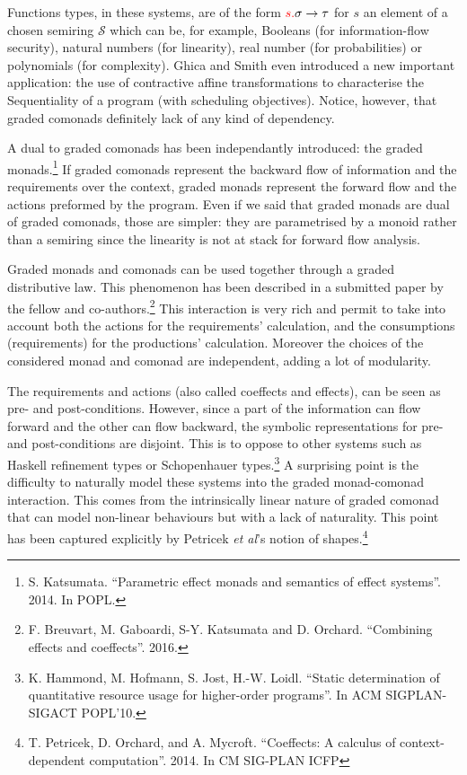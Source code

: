 \documentclass{article}[11pt]
\newcommand\sS{\mathcal S}
\begin{document}
Functions types, in these systems, are of the form ${\color{red}s.}\sigma\rightarrow \tau$ for $s$ an element of a chosen semiring $\sS$ which can be, for example, Booleans (for information-flow security), natural numbers (for linearity), real number (for probabilities) or polynomials (for complexity). Ghica and Smith even introduced a new important application: the use of contractive affine transformations to characterise the Sequentiality of a program (with scheduling objectives). Notice, however, that graded comonads definitely lack of any kind of dependency.

A dual to graded comonads has been independantly introduced: the graded monads.\footnote{S. Katsumata. ``Parametric effect monads and semantics of effect systems''. 2014. In POPL.} If graded comonads represent the backward flow of information and the requirements over the context, graded monads represent the forward flow and the actions preformed by the program. Even if we said that graded monads are dual of graded comonads, those are simpler: they are parametrised by a monoid rather than a semiring since the linearity is not at stack for forward flow analysis.

Graded monads and comonads can be used together through a graded distributive law. This phenomenon has been described in a submitted paper by the fellow and co-authors.\footnote{F. Breuvart, M. Gaboardi, S-Y. Katsumata and D. Orchard. ``Combining effects and coeffects''. 2016.} This interaction is very rich and permit to take into account both the actions for the requirements' calculation, and the consumptions (requirements) for the productions' calculation. Moreover the choices of the considered monad and comonad are independent, adding a lot of modularity.

The requirements and actions (also called coeffects and effects), can be seen as pre- and post-conditions. However, since a part of the information can flow forward and the other can flow backward, the symbolic representations for pre- and post-conditions are disjoint. This is to oppose to other systems such as Haskell refinement types or Schopenhauer types.\footnote{K. Hammond, M. Hofmann, S. Jost, H.-W. Loidl. ``Static determination of quantitative resource usage for higher-order programs''. In ACM SIGPLAN-SIGACT POPL’10.} A surprising point is the difficulty to naturally model these systems into the graded monad-comonad interaction. This comes from the intrinsically linear nature of graded comonad that can model non-linear behaviours but with a lack of naturality. This point has been captured explicitly by Petricek {\em et al}'s notion of shapes.\footnote{T. Petricek, D. Orchard, and A. Mycroft. ``Coeffects: A calculus of context-dependent computation''. 2014. In CM SIG-PLAN ICFP}
\end{document}
